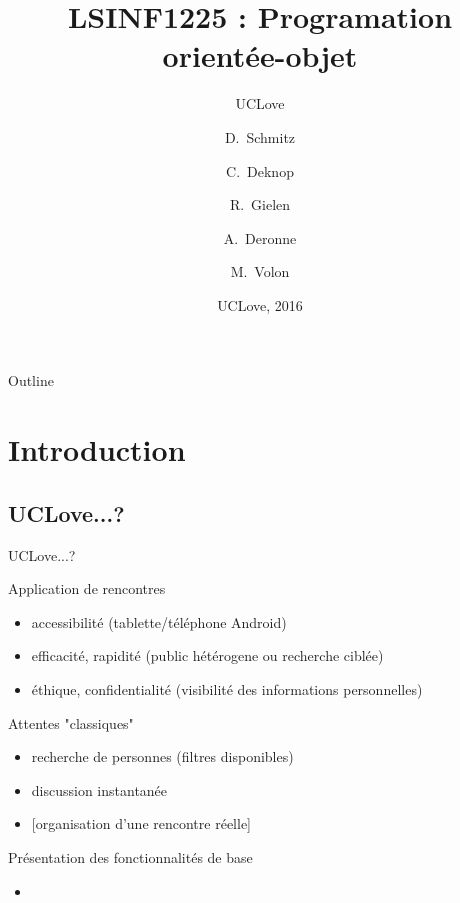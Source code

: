 \documentclass{beamer}
\title{LSINF1225 : Programation orientée-objet}
\subtitle{UCLove}
\author{D.~Schmitz\inst{1} \and C.~Deknop\inst{2} \and R.~Gielen\inst{3} \and A.~Deronne\inst{4} \and M.~Volon\inst{5}}
\institute[Université de Louvain-la-Neuve] %
{
  \inst{1}%
  SINF11BA
  \and
  \inst{2}%
  SINF12BA
  \and
  \inst{3}%
  SINF12BA
  \and
  \inst{4}%
  SINF12BA
  \and
  \inst{5}%
  LING2MS/LA
  }
\date{UCLove, 2016}
\begin{document}
\begin{frame}
  \titlepage
\end{frame}

\begin{frame}{Outline}
  \tableofcontents
\end{frame}

\section{Introduction}

\subsection{UCLove...?}
\begin{frame}{UCLove...?}
\begin{block}{Application de rencontres}
			\begin{itemize}
				\item{
					accessibilit\'e (tablette/t\'el\'ephone Android)
				}
				\item{
					efficacit\'e, rapidit\'e (public h\'et\'erogene ou recherche cibl\'ee)
				}
				\item{
					\'ethique, confidentialit\'e (visibilit\'e des informations personnelles)
				}
			\end{itemize}
\end{block}
\begin{block}{Attentes "classiques"}
	\begin{itemize}
				\item{
					recherche de personnes (filtres disponibles)
				}
				\item{
					discussion instantan\'ee
				}
				\item{
					[organisation d'une rencontre r\'eelle]
				}
	\end{itemize}
\end{block}
\begin{block}{Pr\'esentation des fonctionnalit\'es de base}
\end{block}
\end{frame}

\begin{frame}
	\begin{itemize}
	
	\item{
	
	}
	\end{itemize}
\end{frame}
\end{document}
